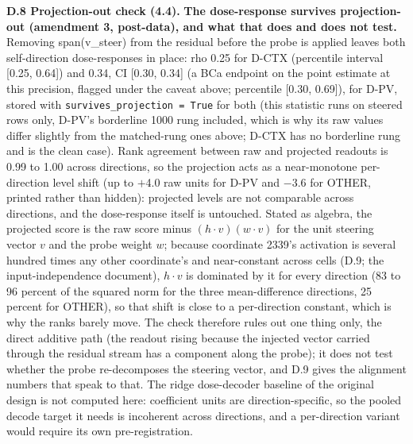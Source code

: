 \documentclass[11pt,a4paper]{article}
\newcommand{\pnum}[2]{#2}
\begin{document}
\textbf{D.8 Projection-out check (4.4).} \textbf{The dose-response survives projection-out (amendment 3, post-data), and what that does and does not test.} Removing span(v\_steer) from the residual before the probe is applied leaves both self-direction dose-responses in place: rho \pnum{panelAp\_projout\_check}{0.25} for D-CTX (percentile interval [0.25, 0.64]) and 0.34, CI [0.30, 0.34] (a BCa endpoint on the point estimate at this precision, flagged under the caveat above; percentile [0.30, 0.69]), for D-PV, stored with \texttt{survives\_projection = True} for both (this statistic runs on steered rows only, D-PV's borderline 1000 rung included, which is why its raw values differ slightly from the matched-rung ones above; D-CTX has no borderline rung and is the clean case). Rank agreement between raw and projected readouts is 0.99 to 1.00 across directions, so the projection acts as a near-monotone per-direction level shift (up to $+$4.0 raw units for D-PV and $-$3.6 for OTHER, printed rather than hidden): projected levels are not comparable across directions, and the dose-response itself is untouched. Stated as algebra, the projected score is the raw score minus $(h\cdot v)(w\cdot v)$ for the unit steering vector $v$ and the probe weight $w$; because coordinate 2339's activation is several hundred times any other coordinate's and near-constant across cells (D.9; the input-independence \citet{sun2024massive} document), $h\cdot v$ is dominated by it for every direction (83 to 96 percent of the squared norm for the three mean-difference directions, 25 percent for OTHER), so that shift is close to a per-direction constant, which is why the ranks barely move. The check therefore rules out one thing only, the direct additive path (the readout rising because the injected vector carried through the residual stream has a component along the probe); it does not test whether the probe re-decomposes the steering vector, and D.9 gives the alignment numbers that speak to that. The ridge dose-decoder baseline of the original design is not computed here: coefficient units are direction-specific, so the pooled decode target it needs is incoherent across directions, and a per-direction variant would require its own pre-registration.
\end{document}

